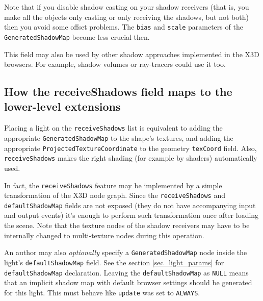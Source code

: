 \documentclass{acmsiggraph}                     %
\begin{document}
Note that if you disable shadow casting on your shadow receivers
(that is, you make all the objects only casting or only receiving the shadows,
but not both) then you avoid some offset problems. The \texttt{bias}
and \texttt{scale} parameters of the \texttt{GeneratedShadowMap}
become less crucial then.

This field may also be used by other shadow approaches implemented
in the X3D browsers. For example, shadow volumes or ray-tracers
could use it too.

\subsection{How the receiveShadows field maps to the lower-level extensions}
\label{sec_how_receive_shadows_maps}

Placing a light on the \texttt{receiveShadows} list is equivalent to
adding the appropriate \texttt{GeneratedShadowMap} to the shape's textures,
and adding the appropriate \texttt{ProjectedTextureCoordinate} to the geometry
\texttt{texCoord} field. Also, \texttt{receiveShadows} makes
the right shading (for example by shaders) automatically used.

In fact, the \texttt{receiveShadows} feature may be
implemented by a simple transformation of the X3D node graph.
Since the \texttt{receiveShadows} and \texttt{defaultShadowMap}
fields are not exposed (they do not have accompanying
input and output events) it's enough to perform such transformation
once after loading the scene.
Note that the texture nodes of the shadow receivers
may have to be internally changed to multi-texture nodes during this operation.



An author may also \emph{optionally} specify
a \texttt{GeneratedShadowMap} node inside the light's
\texttt{defaultShadowMap} field. See the section \ref{sec_light_params}
for \texttt{defaultShadowMap} declaration.
Leaving the \texttt{defaultShadowMap} as \texttt{NULL} means that an
implicit shadow map with default browser settings should be generated
for this light. This must behave like \texttt{update} was set to
\texttt{ALWAYS}.
\end{document}

